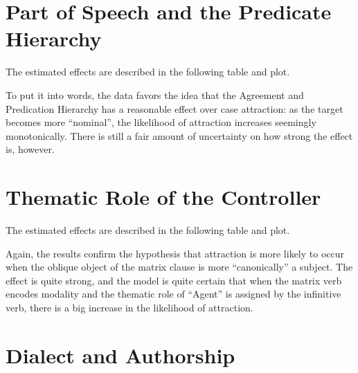 \documentclass[a4paper, 12pt, article]{memoir}
\begin{document}
\section{Part of Speech and the Predicate Hierarchy} %

The estimated effects are described in the following table and plot.

%   
%   
%
%
%
To put it into words, the data favors the idea that the Agreement and
Predication Hierarchy has a reasonable effect over case attraction:
as the target becomes more ``nominal'', the likelihood of attraction
increases seemingly monotonically.
There is still a fair amount of uncertainty on how strong the effect is,
however.

\section{Thematic Role of the Controller} %

The estimated effects are described in the following table and plot.

%   
%   
%
%
Again, the results confirm the hypothesis that attraction is more likely to
occur when the oblique object of the matrix clause is more ``canonically'' a
subject.
The effect is quite strong, and the model is quite certain that when the matrix
verb encodes modality and the thematic role of ``Agent'' is assigned by the
infinitive verb, there is a big increase in the likelihood of attraction.


\section{Dialect and Authorship} %
\end{document}
